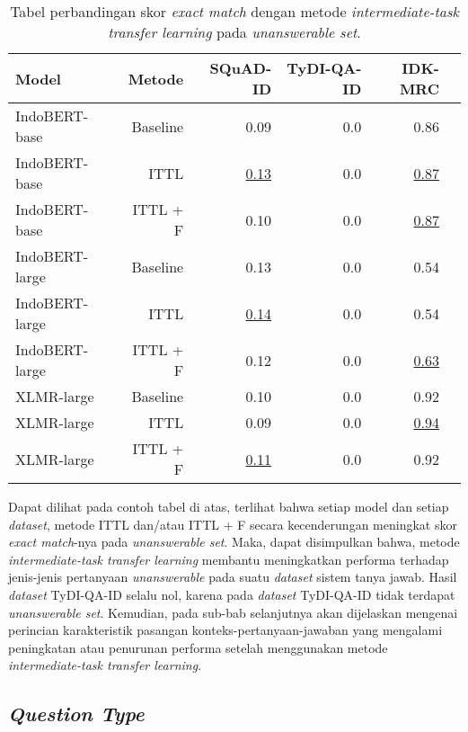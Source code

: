 \begin{table}[H]\centering
\begin{tabular}{lrrrrr}\toprule
Model &Metode &SQuAD-ID &TyDI-QA-ID &IDK-MRC \\\midrule
IndoBERT-base &Baseline &0.09 &0.0 &0.86 \\
IndoBERT-base &ITTL &\underline{0.13} &0.0 &\underline{0.87} \\
IndoBERT-base &ITTL + F &0.10 &0.0 &\underline{0.87} \\
\hline
IndoBERT-large &Baseline &0.13 &0.0 &0.54 \\
IndoBERT-large &ITTL &\underline{0.14} &0.0 &0.54 \\
IndoBERT-large &ITTL + F &0.12 &0.0 &\underline{0.63} \\
\hline
XLMR-large &Baseline &0.10 &0.0 &0.92 \\
XLMR-large &ITTL &0.09 &0.0 &\underline{0.94} \\
XLMR-large &ITTL + F &\underline{0.11} &0.0 &0.92 \\
\bottomrule
\end{tabular}
\caption{Tabel perbandingan skor \emph{exact match} dengan metode \emph{intermediate-task transfer learning} pada \emph{unanswerable set}.}
\end{table}

Dapat dilihat pada contoh tabel di atas, terlihat bahwa setiap model dan setiap \emph{dataset}, metode ITTL dan/atau ITTL + F secara kecenderungan meningkat skor \emph{exact match}-nya pada \emph{unanswerable set}. Maka, dapat disimpulkan bahwa, metode \emph{intermediate-task transfer learning} membantu meningkatkan performa terhadap jenis-jenis pertanyaan \emph{unanswerable} pada suatu \emph{dataset} sistem tanya jawab. Hasil \emph{dataset} TyDI-QA-ID selalu nol, karena pada \emph{dataset} TyDI-QA-ID tidak terdapat \emph{unanswerable set}. Kemudian, pada sub-bab selanjutnya akan dijelaskan mengenai perincian karakteristik pasangan konteks-pertanyaan-jawaban yang mengalami peningkatan atau penurunan performa setelah menggunakan metode \emph{intermediate-task transfer learning}.

\subsection{\emph{Question Type}}

